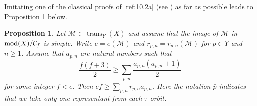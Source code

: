 \documentclass{amsproc}
\def\Cscr{{\mathcal C}}
\def\Mscr{{\mathcal M}}
\def\mod{\mathop{\text{mod}}}
\def\trans{\operatorname{trans}}
\let\oldtext\text
\def\text#1{\oldtext{\upshape #1}}
\newtheorem{propositions}[lemmas]{Proposition}
\theoremstyle{definition}
\theoremstyle{remark}
\numberwithin{equation}{section}
\numberwithin{table}{section}
\numberwithin{figure}{section}
\begin{document}
Imitating one of the classical proofs of \eqref{ref:10.2a} (see
\cite{Fulton}) as far as possible leads to Proposition
\ref{ref:10.1.2a} below.
\begin{propositions}
\label{ref:10.1.2a}
 Let $\Mscr\in \trans_Y(X)$ and assume that the
  image of $\Mscr$ in $\mod(X)/\Cscr_f$ is simple. Write $e=e(\Mscr)$ and
  $r_{p,n}=r_{p,n}(\Mscr)$ for $p\in Y$ and $n\ge 1$. Assume that
  $a_{p,n}$ are natural numbers such that 
\begin{equation}
\label{ref:10.3a}
\frac{f(f+3)}{2}\ge \sum_{\bar{p},n}\frac{a_{p,n}(a_{p,n}+1)}{2}
\end{equation}
for some integer $f<e$.
Then $ef\ge \sum_{\bar{p},n} r_{p,n} a_{p,n}$. Here the notation
$\bar{p}$ indicates that we take only one representant from each $\tau$-orbit.
\end{propositions}
\end{document}

